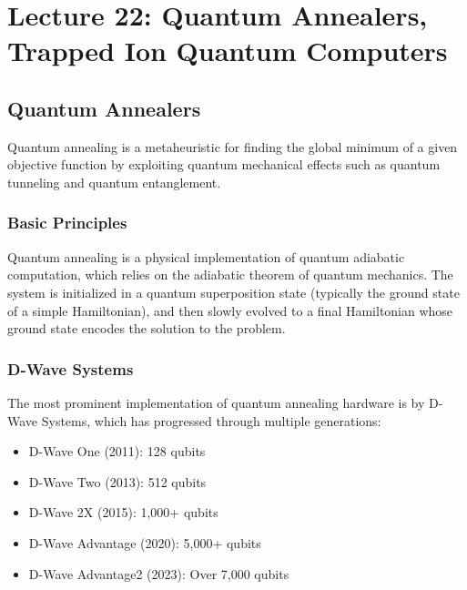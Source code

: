\section{Lecture 22: Quantum Annealers, Trapped Ion Quantum Computers}
\label{sec:lecture22}

\subsection*{Quantum Annealers}

Quantum annealing is a metaheuristic for finding the global minimum of a
given objective function by exploiting quantum mechanical effects such as
quantum tunneling and quantum entanglement.

\subsubsection*{Basic Principles}
Quantum annealing is a physical implementation of quantum adiabatic
computation, which relies on the adiabatic theorem of quantum mechanics. The
system is initialized in a quantum superposition state (typically the ground
state of a simple Hamiltonian), and then slowly evolved to a final
Hamiltonian whose ground state encodes the solution to the problem.


\subsubsection*{D-Wave Systems}

The most prominent implementation of quantum annealing hardware is by D-Wave
Systems, which has progressed through multiple generations:

\begin{itemize}
  \item D-Wave One (2011): 128 qubits
  \item D-Wave Two (2013): 512 qubits
  \item D-Wave 2X (2015): 1,000+ qubits
  \item D-Wave Advantage (2020): 5,000+ qubits
  \item D-Wave Advantage2 (2023): Over 7,000 qubits
\end{itemize}

